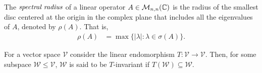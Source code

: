 \begin{defn}
	The $\emph{spectral radius}$ of a linear operator $A \in \mathcal{M}_{n,n}(\mathbb{C})$
	is the radius of the smallest disc centered at the origin in the complex plane
	that includes all the eigenvalues of $A$, denoted by $\rho(A)$. That is,
	\begin{align*}
		\rho(A) &= \max \{ | \lambda | : \lambda \in \sigma(A) \}.
	\end{align*}
\end{defn}

\begin{defn}
	For a vector space $\mathcal{V}$ consider the linear endomorphism
	$T: \mathcal{V} \to \mathcal{V}$. Then, for some subspace $\mathcal{W} \leq \mathcal{V}$,
	$\mathcal{W}$ is said to be $T$-invariant if $T(\mathcal{W}) \subseteq \mathcal{W}$.
\end{defn}

